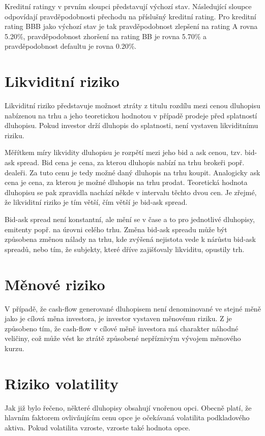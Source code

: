 \documentclass[a4paper]{book}
\begin{document}
Kreditní ratingy v prvním sloupci představují výchozí stav. Následující sloupce odpovídají pravděpodobnosti přechodu na příslušný kreditní rating. Pro kreditní rating BBB jako výchozí stav je tak pravděpodobnost zlepšení na rating A rovna 5.20\%, pravděpodobnost zhoršení na rating BB je rovna 5.70\% a pravděpodobnost defaultu je rovna 0.20\%.

\section{Likviditní riziko}

Likviditní riziko představuje možnost ztráty z titulu rozdílu mezi cenou dluhopisu nabízenou na trhu a jeho teoretickou hodnotou v případě prodeje před splatností dluhopisu.  Pokud investor drží dluhopis do splatnosti, není vystaven likviditnímu riziku.

Měřítkem míry likvidity dluhopisu je rozpětí mezi jeho bid a ask cenou, tzv. bid-ask spread. Bid cena je cena, za kterou dluhopis nabízí na trhu brokeři popř. dealeři. Za tuto cenu je tedy možné daný dluhopis na trhu koupit. Analogicky ask cena je cena, za kterou je možné dluhopis na trhu prodat. Teoretická hodnota dluhopisu se pak zpravidla nachází někde v intervalu těchto dvou cen. Je zřejmé, že likviditní riziko je tím větší, čím větší je bid-ask spread.

Bid-ask spread není konstantní, ale mění se v čase a to pro jednotlivé dluhopisy, emitenty popř. na úrovni celého trhu. Změna bid-ask spreadu může být způsobena změnou nálady na trhu, kde zvýšená nejistota vede k nárůstu bid-ask spreadů, nebo tím, že subjekty, které dříve zajišťovaly likviditu, opustily trh.

\section{Měnové riziko}

V případě, že cash-flow generované dluhopisem není denominované ve stejné měně jako je cílová měna investora, je investor vystaven měnovému riziku. Z je způsobeno tím, že cash-flow v cílové měně investora má charakter náhodné veličiny, což může vést ke ztrátě způsobené nepříznivým vývojem měnového kurzu.

\section{Riziko volatility}

Jak již bylo řečeno, některé dluhopisy obsahují vnořenou opci. Obecně platí, že hlavním faktorem ovlivňujícím cenu opce je očekávaná volatilita podkladového aktiva. Pokud volatilita vzroste, vzroste také hodnota opce.
\end{document}
